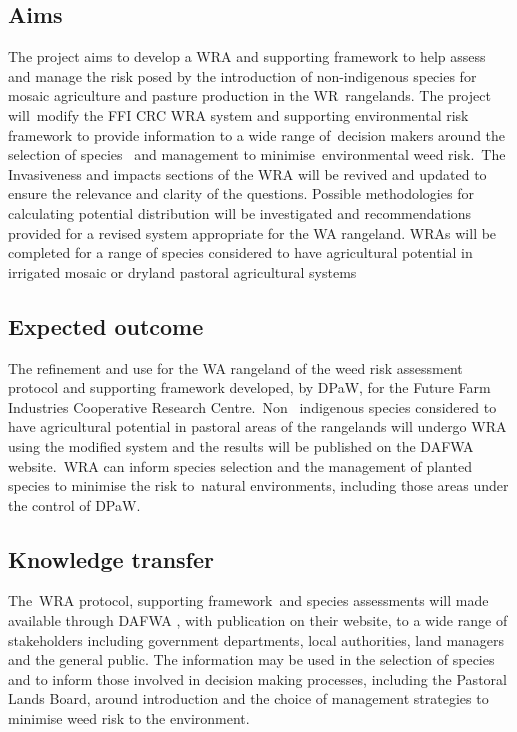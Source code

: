 \documentclass[version=last,
    paper=a4, %
    10pt, %
    usenames,
    dvipsnames,
    oneside, %
    headings=openany, %
    DIV=15 %
]{scrbook}
\begin{document}
\subsection*{Aims}
The project aims to develop a WRA and supporting framework to help
assess and manage the risk posed by the introduction of non-indigenous
species for mosaic agriculture and pasture production in the
WR~rangelands. The project will~modify the FFI CRC WRA system and
supporting environmental risk framework to provide information to a wide
range of~decision makers around the selection of species~ and management
to minimise~environmental weed risk.~The Invasiveness and impacts
sections of the WRA will be revived and updated to ensure the relevance
and clarity of the questions. Possible methodologies for calculating
potential distribution will be investigated and recommendations provided
for a revised system appropriate for the WA rangeland. WRAs will be
completed for a range of species considered to have agricultural
potential in irrigated mosaic or dryland pastoral agricultural systems



\subsection*{Expected outcome}
The refinement and use for the WA rangeland of the weed risk assessment
protocol and supporting framework developed, by DPaW, for the Future
Farm Industries Cooperative Research Centre.~Non~ indigenous species
considered to have agricultural potential in pastoral areas of the
rangelands will undergo WRA using the modified system and the results
will be published on the DAFWA website.~WRA can inform species selection
and the management of planted species to minimise the risk to~natural
environments, including those areas under the control of DPaW.



\subsection*{Knowledge transfer}
The~WRA protocol, supporting framework~and species assessments will made
available through DAFWA , with publication on their website, to a wide
range of stakeholders including government departments, local
authorities, land managers and the general public. The information may
be used in the selection of species and to inform those involved in
decision making processes, including the Pastoral Lands Board, around
introduction and the choice of management strategies to minimise weed
risk to the environment.
\end{document}
